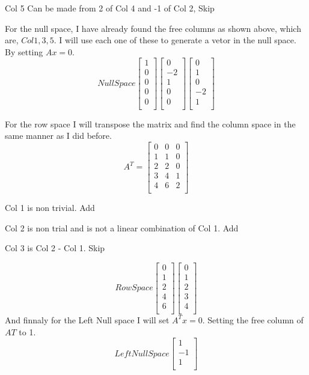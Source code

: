 \documentclass{article}
\begin{document}
Col 5 Can be made from 2 of Col 4 and -1 of Col 2, Skip

For the null space, I have already found the free columns as shown above, which are, $Col 1, 3, 5$. I will use each one of these to generate a vetor in the null space. By setting $Ax = 0$.
\[
Null Space
\begin{bmatrix}
1 \\
0 \\
0 \\
0 \\
0 \\
\end{bmatrix}
\begin{bmatrix}
0 \\
-2 \\
1 \\
0 \\
0 \\
\end{bmatrix}
\begin{bmatrix}
0 \\
1 \\
0 \\
-2 \\
1 \\
\end{bmatrix}
\]

For the row space I will transpose the matrix and find the column space in the same manner as I did before.
\[
A^{T} = 
\begin{bmatrix}
0 & 0 & 0 \\
1 & 1 & 0 \\
2 & 2 & 0 \\
3 & 4 & 1 \\
4 & 6 & 2 \\
\end{bmatrix}
\]

Col 1 is non trivial. Add

Col 2 is non trial and is not a linear combination of Col 1. Add

Col 3 is Col 2 - Col 1. Skip

\[
Row Space
\begin{bmatrix}
0 \\
1 \\
2 \\
4 \\
6 \\
\end{bmatrix}
\begin{bmatrix}
0 \\
1 \\
2 \\
3 \\
4 \\
\end{bmatrix}
\]
And finnaly for the Left Null space I will set $A^{T}x = 0$. Setting the free column of $A{T}$ to 1.
\[
Left Null Space
\begin{bmatrix}
1 \\
-1 \\
1 \\
\end{bmatrix}
\]
\end{document}
